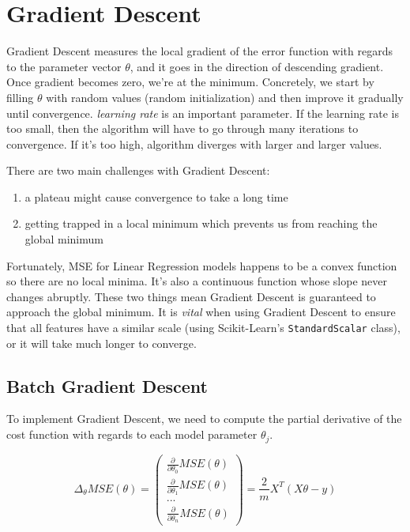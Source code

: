 \documentclass[letterpaper]{article}
\begin{document}
\section{Gradient Descent}
Gradient Descent measures the local gradient of the error function with regards to the parameter vector $\theta$, and it goes in the direction of descending gradient. Once gradient becomes zero, we're at the minimum. Concretely, we start by filling $\theta$ with random values (random initialization) and then improve it gradually until convergence. \textsl{learning rate} is an important parameter. If the learning rate is too small, then the algorithm will have to go through many iterations to convergence. If it's too high, algorithm diverges with larger and larger values. 

There are two main challenges with Gradient Descent:
\begin{enumerate}
	\item a plateau might cause convergence to take a long time
	\item getting trapped in a local minimum which prevents us from reaching the global minimum
\end{enumerate}

Fortunately, MSE for Linear Regression models happens to be a convex function so there are no local minima. It's also a continuous function whose slope never changes abruptly. These two things mean Gradient Descent is guaranteed to approach the global minimum. It is \textsl{vital} when using Gradient Descent to ensure that all features have a similar scale (using Scikit-Learn's \texttt{StandardScalar} class), or it will take much longer to converge. 

\subsection{Batch Gradient Descent}
To implement Gradient Descent, we need to compute the partial derivative of the cost function with regards to each model parameter $\theta_{j}$. 

$$\Delta_{\theta} MSE (\theta) = 
\begin{pmatrix}
\frac{\partial}{\partial \theta_{0}} MSE(\theta) \\ \frac{\partial}{\partial \theta_{1}} MSE(\theta) \\ ... \\ \frac{\partial}{\partial \theta_{n}} MSE(\theta)
\end{pmatrix} = \frac{2}{m}X^{T}(X\theta - y)
$$
\end{document}
